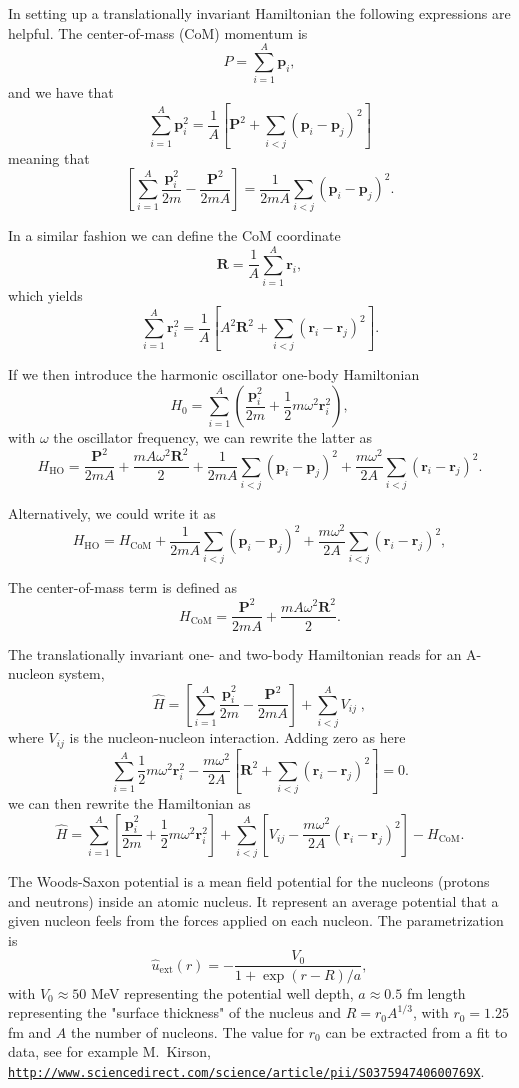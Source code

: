 \documentclass[graybox,sectrefs,envcountresetchap,open=right]{svmonodo}
\begin{document}
 In setting up a translationally invariant Hamiltonian  
 the following expressions are helpful.
 The center-of-mass (CoM)  momentum is
\[
    P=\sum_{i=1}^A\bm{p}_i,
 \]
 and we have that
\[
 \sum_{i=1}^A\bm{p}_i^2 =
 \frac{1}{A}\left[\bm{P}^2+\sum_{i < j}(\bm{p}_i-\bm{p}_j)^2\right]
 \]
 meaning that
\[
 \left[\sum_{i=1}^A\frac{\bm{p}_i^2}{2m} -\frac{\bm{P}^2}{2mA}\right]
 =\frac{1}{2mA}\sum_{i < j}(\bm{p}_i-\bm{p}_j)^2.
 \]

 In a similar fashion we can define the CoM coordinate
\[
     \bm{R}=\frac{1}{A}\sum_{i=1}^{A}\bm{r}_i,
 \]
 which yields
 \[
 \sum_{i=1}^A\bm{r}_i^2 =
 \frac{1}{A}\left[A^2\bm{R}^2+\sum_{i < j}(\bm{r}_i-\bm{r}_j)^2\right].
 \]


 If we then introduce the harmonic oscillator one-body Hamiltonian
\[
      H_0= \sum_{i=1}^A\left(\frac{\bm{p}_i^2}{2m}+
	   \frac{1}{2}m\omega^2\bm{r}_i^2\right),
 \]
 with $\omega$ the oscillator frequency,
 we can rewrite the latter as 
 \[
      H_{\mathrm{HO}}= \frac{\bm{P}^2}{2mA}+\frac{mA\omega^2\bm{R}^2}{2}
	    +\frac{1}{2mA}\sum_{i < j}(\bm{p}_i-\bm{p}_j)^2
	    +\frac{m\omega^2}{2A}\sum_{i < j}(\bm{r}_i-\bm{r}_j)^2.
     \label{eq:obho}
 \]

Alternatively, we could write it as	
\[
 H_{\mathrm{HO}}= H_{\mathrm{CoM}}+\frac{1}{2mA}\sum_{i < j}(\bm{p}_i-\bm{p}_j)^2
	    +\frac{m\omega^2}{2A}\sum_{i < j}(\bm{r}_i-\bm{r}_j)^2,
 \]

The center-of-mass term is defined as
 \[
      H_{\mathrm{CoM}}= \frac{\bm{P}^2}{2mA}+\frac{mA\omega^2\bm{R}^2}{2}.
 \]


 The translationally invariant one- and two-body  Hamiltonian reads for an A-nucleon system,
 \[
\label{eq:ham}
\hat{H}=\left[\sum_{i=1}^A\frac{\bm{p}_i^2}{2m} -\frac{\bm{P}^2}{2mA}\right] +\sum_{i < j}^A V_{ij} \; ,
 \]
 where $V_{ij}$ is the nucleon-nucleon interaction. Adding zero as here
\[
 \sum_{i=1}^A\frac{1}{2}m\omega^2\bm{r}_i^2-
 \frac{m\omega^2}{2A}\left[\bm{R}^2+\sum_{i < j}(\bm{r}_i-\bm{r}_j)^2\right]=0.
 \]
we can then rewrite the Hamiltonian as 
\[
 \hat{H}=\sum_{i=1}^A \left[ \frac{\bm{p}_i^2}{2m}
 +\frac{1}{2}m\omega^2 \bm{r}^2_i
 \right] + \sum_{i < j}^A \left[ V_{ij}-\frac{m\omega^2}{2A}
 (\bm{r}_i-\bm{r}_j)^2
 \right]-H_{\mathrm{CoM}}.
 \]


The Woods-Saxon potential is a mean field potential for the nucleons (protons and neutrons) 
inside an atomic nucleus. It represent an average potential that a given nucleon feels from  the forces applied on each nucleon. 
The parametrization is
\[
\hat{u}_{\mathrm{ext}}(r)=-\frac{V_0}{1+\exp{(r-R)/a}},
\]
with $V_0\approx 50$ MeV representing the potential well depth, $a\approx 0.5$ fm 
length representing the "surface thickness" of the nucleus and $R=r_0A^{1/3}$, with $r_0=1.25$ fm and $A$ the number of nucleons.
The value for $r_0$ can be extracted from a fit to data, see for example M.~Kirson, \href{{http://www.sciencedirect.com/science/article/pii/S037594740600769X}}{\nolinkurl{http://www.sciencedirect.com/science/article/pii/S037594740600769X}}.
\end{document}
